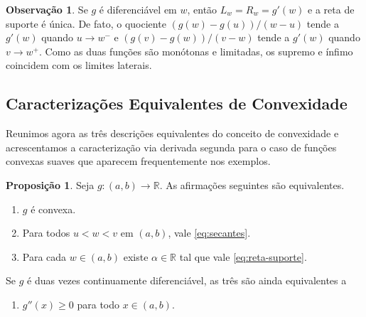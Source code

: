 \documentclass[12pt,portuguese]{article}
\theoremstyle{definition}
\newtheorem{proposition}[proposition]{Proposição}
\newtheorem{remark}[remark]{Observação}
\theoremstyle{plainexercise}
\theoremstyle{starredexercise}
\theoremstyle{definition}
\begin{document}


\begin{remark}\label{rem:suporte-derivavel}
Se $g$ é diferenciável em $w$, então $L_w=R_w=g'(w)$ e a reta de suporte é
única. De fato, o quociente $(g(w)-g(u))/(w-u)$ tende a $g'(w)$ quando
$u\to w^-$ e $(g(v)-g(w))/(v-w)$ tende a $g'(w)$ quando $v\to w^+$. Como as
duas funções são monótonas e limitadas, os supremo e ínfimo coincidem com os
limites laterais.
\end{remark}

\subsection{Caracterizações Equivalentes de Convexidade}\label{subsec:caracterizacoes}

Reunimos agora as três descrições equivalentes do conceito de convexidade e acrescentamos 
a caracterização via derivada segunda para o caso de funções convexas suaves
que aparecem frequentemente nos exemplos.

\begin{proposition}\label{prop:caracterizacoes}
Seja $g\colon(a,b)\to\mathbb{R}$. As afirmações seguintes são equivalentes.
\begin{enumerate}[label=(\roman*)]
\item $g$ é convexa.
\item Para todos $u<w<v$ em $(a,b)$, vale \eqref{eq:secantes}.
\item Para cada $w\in(a,b)$ existe $\alpha\in\mathbb{R}$ tal que vale
\eqref{eq:reta-suporte}.
\end{enumerate}
Se $g$ é duas vezes continuamente diferenciável, as três são ainda equivalentes a
\begin{enumerate}[label=(\roman*),start=4]
\item $g''(x)\geqslant0$ para todo $x\in(a,b)$.
\end{enumerate}
\end{proposition}
\end{document}
